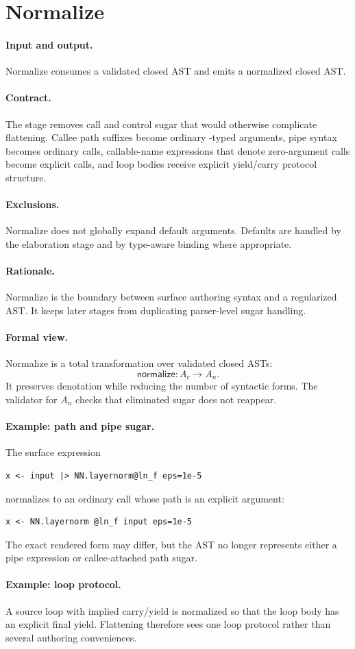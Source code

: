 \section{Normalize}

\paragraph{Input and output.}
Normalize consumes a validated closed AST and emits a normalized closed AST.

\paragraph{Contract.}
The stage removes call and control sugar that would otherwise complicate
flattening.  Callee path suffixes become ordinary -typed arguments,
pipe syntax becomes ordinary calls, callable-name expressions that denote
zero-argument calls become explicit calls, and loop bodies receive explicit
yield/carry protocol structure.

\paragraph{Exclusions.}
Normalize does not globally expand default arguments.  Defaults are handled by
the elaboration stage and by type-aware binding where appropriate.

\paragraph{Rationale.}
Normalize is the boundary between surface authoring syntax and a regularized
AST.  It keeps later stages from duplicating parser-level sugar handling.

\paragraph{Formal view.}
Normalize is a total transformation over validated closed ASTs:
\[
  \mathsf{normalize}: A_c \rightarrow A_n .
\]
It preserves denotation while reducing the number of syntactic forms.  The
validator for \(A_n\) checks that eliminated sugar does not reappear.

\paragraph{Example: path and pipe sugar.}
The surface expression
\begin{verbatim}
x <- input |> NN.layernorm@ln_f eps=1e-5
\end{verbatim}
normalizes to an ordinary call whose path is an explicit argument:
\begin{verbatim}
x <- NN.layernorm @ln_f input eps=1e-5
\end{verbatim}
The exact rendered form may differ, but the AST no longer represents either a
pipe expression or callee-attached path sugar.

\paragraph{Example: loop protocol.}
A source loop with implied carry/yield is normalized so that the loop body has
an explicit final yield.  Flattening therefore sees one loop protocol rather
than several authoring conveniences.
